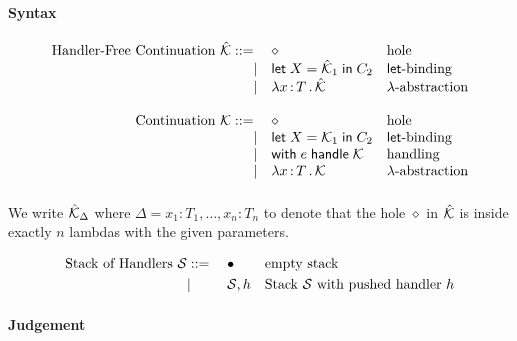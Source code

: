 \documentclass{article}
\newcommand{\bnf}{\mathrel{{:}{:}{=}}}
\newcommand{\bnfor}{|}
\newcommand{\x}{x}     %
\newcommand{\C}{C}     %
\newcommand{\X}{X}     %
\newcommand{\e}{e}     %
\newcommand{\rgn}{r}   %
\newcommand{\h}{h}     %
\newcommand{\T}{T}     %
\newcommand{\letin}[1]{\mathsf{let}\; #1 \;\mathsf{in}\;} %
\newcommand{\withhandle}[1]{\mathsf{with}\;#1\;\mathsf{handle}\;} %
\newcommand{\abs}[1]{\mathsf{abs}\;#1\;\mathsf{in}\;} %
\newcommand{\lam}[2]{\lambda #1 \,{:}\, #2 \,.\,} %
\newcommand{\cont}{{\cal K}}     %
\newcommand{\hfcont}{\hat{\cal K}}     %
\newcommand{\hole}{\diamond}
\newcommand{\D}{\Delta}
\renewcommand{\S}{{\cal S}}
\newcommand{\emptystack}{\bullet}
\begin{document}
\paragraph{Syntax}

\begin{equation*}
  \begin{array}{rll}
  \text{Handler-Free Continuation $\hfcont$}  \bnf   {} & \hole                & \text{hole} \\
    \bnfor {} & \letin{\X = \hfcont_1} \C_2  & \text{$\mathsf{let}$-binding} \\
    \bnfor {} & \lam{\x}{\T} \hfcont   & \text{$\lambda$-abstraction} \\
    \\
  \text{Continuation $\cont$}  \bnf   {} & \hole                & \text{hole} \\
    \bnfor {} & \letin{\X = \cont_1} \C_2  & \text{$\mathsf{let}$-binding} \\
    \bnfor {} & \withhandle{\e} \cont & \text{handling} \\
    \bnfor {} & \lam{\x}{\T} \cont   & \text{$\lambda$-abstraction} \\[10pt]
  \end{array}
\end{equation*}
%
We write $\hfcont_\D$ where $\D = {\x_1{:}\T_1,\ldots,x_n{:}T_n}$ to denote that the hole $\hole$ in $\hfcont$ is inside
exactly $n$ lambdas with the given parameters.

\begin{equation*}
  \text{Stack of Handlers $\S$}
  \begin{aligned}[t]
    &\bnf   {} && \emptystack                && \text{empty stack} \\
    &\bnfor {} && \S,\h                      && \text{Stack $\S$ with pushed handler $\h$} \\
  \end{aligned}
\end{equation*}
%


\paragraph{Judgement}
\end{document}
